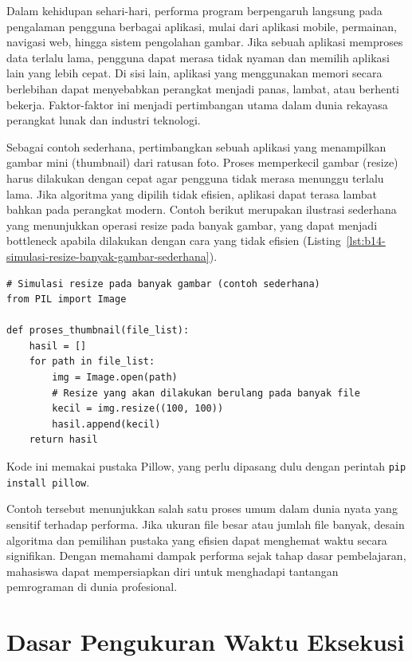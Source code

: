 Dalam kehidupan sehari-hari, performa program berpengaruh langsung pada pengalaman pengguna berbagai aplikasi, mulai dari aplikasi mobile, permainan, navigasi web, hingga sistem pengolahan gambar. Jika sebuah aplikasi memproses data terlalu lama, pengguna dapat merasa tidak nyaman dan memilih aplikasi lain yang lebih cepat. Di sisi lain, aplikasi yang menggunakan memori secara berlebihan dapat menyebabkan perangkat menjadi panas, lambat, atau berhenti bekerja. Faktor-faktor ini menjadi pertimbangan utama dalam dunia rekayasa perangkat lunak dan industri teknologi.

Sebagai contoh sederhana, pertimbangkan sebuah aplikasi yang menampilkan gambar mini (thumbnail) dari ratusan foto. Proses memperkecil gambar (resize) harus dilakukan dengan cepat agar pengguna tidak merasa menunggu terlalu lama. Jika algoritma yang dipilih tidak efisien, aplikasi dapat terasa lambat bahkan pada perangkat modern. Contoh berikut merupakan ilustrasi sederhana yang menunjukkan operasi resize pada banyak gambar, yang dapat menjadi bottleneck apabila dilakukan dengan cara yang tidak efisien (Listing~\ref{lst:b14-simulasi-resize-banyak-gambar-sederhana}).

\begin{lstlisting}[style=PythonStyle, caption={Simulasi resize pada banyak gambar (contoh sederhana)}, label={lst:b14-simulasi-resize-banyak-gambar-sederhana}]
# Simulasi resize pada banyak gambar (contoh sederhana)
from PIL import Image

def proses_thumbnail(file_list):
    hasil = []
    for path in file_list:
        img = Image.open(path)
        # Resize yang akan dilakukan berulang pada banyak file
        kecil = img.resize((100, 100))
        hasil.append(kecil)
    return hasil
\end{lstlisting}

Kode ini memakai pustaka Pillow, yang perlu dipasang dulu dengan perintah \texttt{pip install pillow}.

Contoh tersebut menunjukkan salah satu proses umum dalam dunia nyata yang sensitif terhadap performa. Jika ukuran file besar atau jumlah file banyak, desain algoritma dan pemilihan pustaka yang efisien dapat menghemat waktu secara signifikan. Dengan memahami dampak performa sejak tahap dasar pembelajaran, mahasiswa dapat mempersiapkan diri untuk menghadapi tantangan pemrograman di dunia profesional.

\section{Dasar Pengukuran Waktu Eksekusi}


